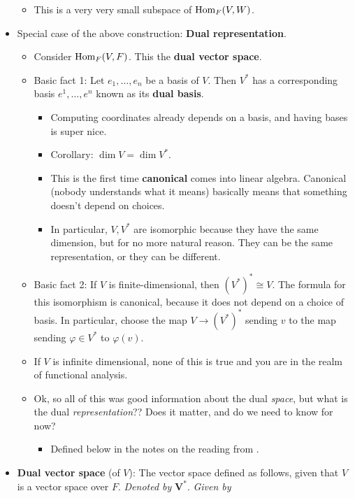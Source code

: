 \documentclass[../notes.tex]{subfiles}
\begin{document}
\begin{itemize}
    \begin{itemize}
        \item This is a very very small subspace of $\operatorname{Hom}_F(V,W)$.
    \end{itemize}
    \item Special case of the above construction: \textbf{Dual representation}.
    \begin{itemize}
        \item Consider $\operatorname{Hom}_F(V,F)$. This the \textbf{dual vector space}.
        \item Basic fact 1: Let $e_1,\dots,e_n$ be a basis of $V$. Then $V^*$ has a corresponding basis $e^1,\dots,e^n$ known as its \textbf{dual basis}.
        \begin{itemize}
            \item Computing coordinates already depends on a basis, and having bases is super nice.
            \item Corollary: $\dim V=\dim V^*$.
            \item This is the first time \textbf{canonical} comes into linear algebra. Canonical (nobody understands what it means) basically means that something doesn't depend on choices.
            \item In particular, $V,V^*$ are isomorphic because they have the same dimension, but for no more natural reason. They can be the same representation, or they can be different.
        \end{itemize}
        \item Basic fact 2: If $V$ is finite-dimensional, then $(V^*)^*\cong V$. The formula for this isomorphism is canonical, because it does not depend on a choice of basis. In particular, choose the map $V\to(V^*)^*$ sending $v$ to the map sending $\varphi\in V^*$ to $\varphi(v)$.
        \item If $V$ is infinite dimensional, none of this is true and you are in the realm of functional analysis.
        \item Ok, so all of this was good information about the dual \emph{space}, but what is the dual \emph{representation}?? Does it matter, and do we need to know for now?
        \begin{itemize}
            \item Defined below in the notes on the reading from \textcite{bib:FultonHarris}.
        \end{itemize}
    \end{itemize}
    \item \textbf{Dual vector space} (of $V$): The vector space defined as follows, given that $V$ is a vector space over $F$. \emph{Denoted by} $\bm{V^*}$. \emph{Given by}

\end{itemize}
\end{document}

